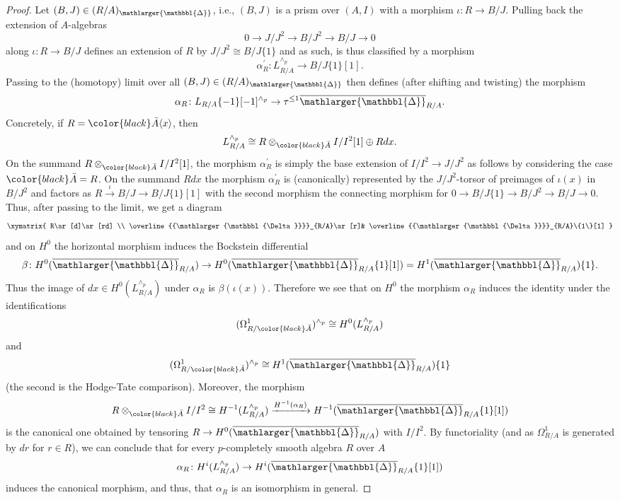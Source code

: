 \documentclass{amsart}
\newcommand{\prism}{{\mathlarger{\mathbbl{\Delta}}}}
\theoremstyle{plain}
\theoremstyle{definition}
\newcommand{\blue}[1]{{\color{black}#1}}
\begin{document}
\begin{proof}
Let $(B,J) \in (R/A)_{\prism}$, i.e., $(B,J)$ is a prism over $(A,I)$ with a morphism $\iota\colon R\to B/J$.
Pulling back the extension of $A$-algebras
$$
0\to J/J^2\to B/J^2\to B/J\to 0
$$
along $\iota\colon R\to B/J$ defines an extension of $R$ by $J/J^2\cong B/J\{1\}$ and as such, is thus classified by a morphism
$$
\alpha_R^\prime\colon L_{R/A}^{\wedge_p}\to B/J\{1\}[1].
$$
Passing to the (homotopy) limit over all $(B,J)\in (R/A)_\prism$ then defines (after shifting and twisting) the morphism
$$
\alpha_R\colon L_{R/A}\{-1\}[-1]^{\wedge_p}\to \tau^{\leq 1}\overline{\prism}_{R/A}. 
$$
Concretely, if $R=\blue{\bar{A}}\langle x\rangle$, then
$$
L_{R/A}^{\wedge_p}\cong R\otimes_{\blue{\bar{A}}} I/I^2[1]\oplus Rdx.
$$
On the summand $R\otimes_{\blue{\bar{A}}}I/I^2[1]$, the morphism $\alpha_R^\prime$ is simply the base extension of $I/I^2\to J/J^2$ as follows by considering the case $\blue{\bar{A}}=R$. On the summand $Rdx$ the morphism $\alpha_R^\prime$ is (canonically) represented by the $J/J^2$-torsor of preimages of $\iota(x)$ in $B/J^2$ and factors as $R\xrightarrow{\iota}B/J\to B/J\{1\}[1]$ with the second morphism the connecting morphism for $0\to B/J\{1\}\to B/J^2\to B/J\to 0$.
Thus, after passing to the limit, we get a diagram
$$
\xymatrix{
  R\ar[d]\ar[rd] \\
  \overline{\prism}_{R/A}\ar[r]& \overline{\prism}_{R/A}\{1\}[1]
}
$$
and on $H^0$ the horizontal morphism induces the Bockstein differential
$$
\beta\colon H^0(\overline{\prism}_{R/A})\to H^0(\overline{\prism}_{R/A}\{1\}[1])=H^1(\overline{\prism}_{R/A})\{1\}. 
$$
Thus the image of $dx\in H^0(L_{R/A}^{\wedge_p})$ under $\alpha_R$ is $\beta(\iota(x))$. Therefore we see that on $H^0$ the morphism $\alpha_R$ induces the identity under the identifications
$$
(\Omega^{1}_{R/\blue{\bar{A}}})^{\wedge_p}\cong H^0(L_{R/A}^{\wedge_p})
$$
and
$$
(\Omega^1_{R/\blue{\bar{A}}})^{\wedge_p}\cong H^1(\overline{\prism}_{R/A})\{1\}
$$
(the second is the Hodge-Tate comparison).
Moreover, the morphism $$R\otimes_{\blue{\bar{A}}}I/I^2\cong H^{-1}(L_{R/A}^{\wedge_p})\xrightarrow{H^{-1}(\alpha_R)} H^{-1}(\overline{\prism}_{R/A}\{1\}[1])$$ is the canonical one obtained by tensoring $R\to H^0(\overline{\prism}_{R/A})$ with $I/I^2$.
By functoriality (and as $\Omega^1_{R/A}$ is generated by $dr$ for $r\in R$), we can conclude that for every $p$-completely smooth algebra $R$ over $A$
$$
\alpha_R\colon H^i(L_{R/A}^{\wedge_p})\to H^i(\overline{\prism}_{R/A}\{1\}[1])
$$
induces the canonical morphism, and thus, that $\alpha_R$ is an isomorphism in general.
\end{proof}
\end{document}

